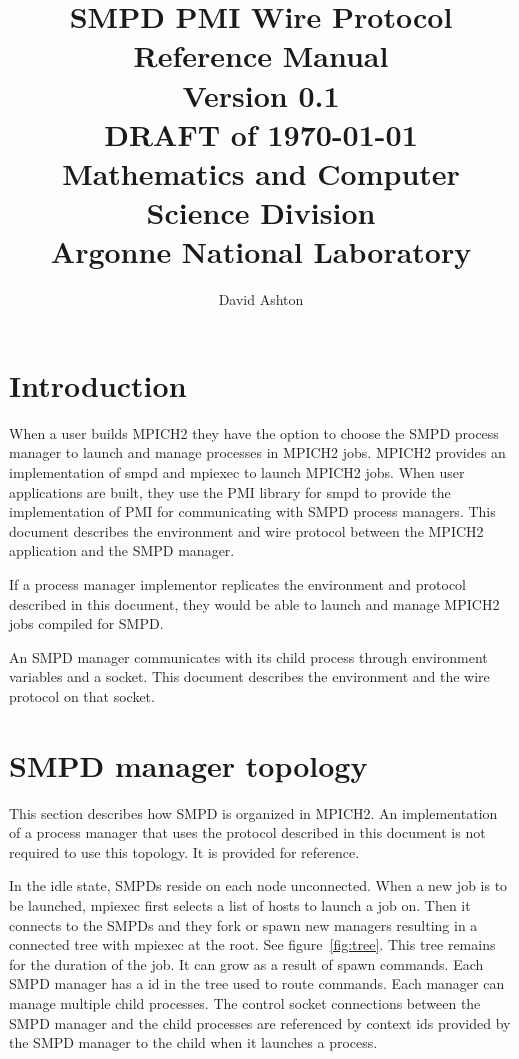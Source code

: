 \documentclass[dvipdfm,11pt]{article}
\begin{document}
\title{SMPD PMI Wire Protocol Reference Manual\\
Version 0.1\\
DRAFT of \today\\
Mathematics and Computer Science Division\\
Argonne National Laboratory}

\author{David Ashton}


\maketitle

\cleardoublepage

\tableofcontents
\clearpage

\pagestyle{headings}


\section{Introduction}

When a user builds MPICH2 they have the option to choose the SMPD process
manager to launch and manage processes in MPICH2 jobs.  MPICH2 provides
an implementation of smpd and mpiexec to launch MPICH2 jobs.  When user
applications are built, they use the PMI library for smpd to provide the 
implementation of PMI for communicating with SMPD process managers. 
This document describes the environment and wire protocol between the 
MPICH2 application and the SMPD manager.

If a process manager implementor replicates the environment and protocol
described in this document, they would be able to launch and manage MPICH2 
jobs compiled for SMPD.

An SMPD manager communicates with its child process through environment
variables and a socket.  This document describes the environment and the 
wire protocol on that socket.

\section{SMPD manager topology}
This section describes how SMPD is organized in MPICH2.  An implementation
of a process manager that uses the protocol described in this document is 
not required to use this topology.  It is provided for reference.

In the idle state, SMPDs reside on each node unconnected.  
When a new job is to be launched, mpiexec first selects a list of hosts 
to launch a job on.  Then it connects to the SMPDs and they fork or spawn 
new managers resulting in a connected tree with mpiexec at the root.
See figure~\ref{fig:tree}.  This tree remains for the duration of the job.
It can grow as a result of spawn commands.  Each SMPD manager has
a id in the tree used to route commands.  Each manager can manage multiple
child processes.  The control socket connections between the SMPD manager
and the child processes are referenced by context ids provided by the
SMPD manager to the child when it launches a process.
\end{document}
